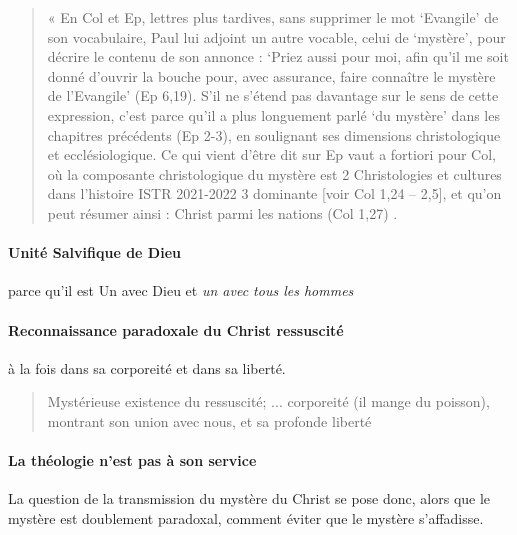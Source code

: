      \begin{quote}
         «  En  Col  et  Ep,  lettres  plus  tardives,  sans  supprimer  le  mot  ‘Evangile’  de  son  vocabulaire, Paul  lui  adjoint  un  autre  vocable,  celui  de  ‘mystère’,  pour  décrire  le  contenu  de  son  annonce  : ‘Priez  aussi  pour  moi,  afin  qu’il  me  soit  donné  d’ouvrir  la  bouche  pour,  avec  assurance,  faire connaître  le  mystère  de  l’Evangile’  (Ep  6,19).  S’il  ne  s’étend  pas  davantage  sur  le  sens  de cette  expression,  c’est  parce  qu’il  a  plus  longuement  parlé  ‘du  mystère’  dans  les  chapitres précédents  (Ep  2-3),  en  soulignant  ses  dimensions  christologique  et  ecclésiologique.  Ce  qui vient  d’être  dit  sur  Ep  vaut  a  fortiori  pour  Col,  où  la  composante  christologique  du  mystère  est 2 Christologies  et  cultures  dans  l’histoire  ISTR  2021-2022 3 dominante  [voir  Col  1,24  –  2,5],  et  qu’on  peut  résumer  ainsi  :  Christ  parmi  les  nations  (Col 1,27) . 
     \end{quote}
    
     
     \paragraph{Unité Salvifique de Dieu} parce qu'il est Un avec Dieu et \textit{un avec tous les hommes}
     
     \paragraph{Reconnaissance paradoxale du Christ ressuscité} à la fois dans sa corporeité et dans sa liberté.
     \begin{quote}
         Mystérieuse existence du ressuscité; ... corporeité (il mange du poisson), montrant son union avec nous, et sa profonde liberté 
     \end{quote}

    \paragraph{La théologie n'est pas à son service} La question de la transmission du mystère du Christ se pose donc, alors que le mystère est doublement paradoxal, comment éviter que le mystère s'affadisse. 
    
    
    
